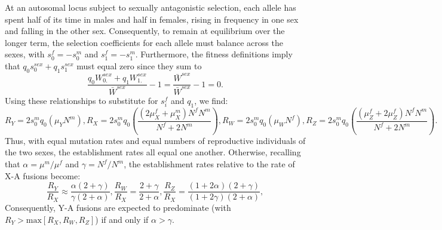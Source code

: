 At an autosomal locus subject to sexually antagonistic selection, each allele has spent half of its time in males and half in females, rising in frequency in one sex and falling in the other sex. Consequently, to remain at equilibrium over the longer term, the selection coefficients for each allele must balance across the sexes, with $s^f_0 = -s^m_0$ and $s^f_\text{1} = -s^m_\text{1}$. Furthermore, the fitness definitions imply that $q_0s^{sex}_0 + q_\text{1}s^{sex}_\text{1}$ must equal zero since they sum to
\[\frac{q_0W^{sex}_{0.} + q_\text{1}W^{sex}_{\text{1}.}}{\bar{W}^{sex}} - \text{1} = \frac{\bar{W}^{sex}}{\bar{W}^{sex}} - \text{1} = 0.\]
Using these relationships to substitute for $s^f_i$ and $q_\text{1}$, we find:
\begin{subequations}
\begin{equation}
R_Y = \text{2}s^m_0 q_0 (\mu_YN^m),
\end{equation}
\begin{equation}
R_X = \text{2}s^m_0 q_0 \left(\frac{(\text{2}\mu^f_X + \mu^m_X)N^fN^m}{N^f + \text{2}N^m} \right),
\end{equation}
\begin{equation}
R_W = \text{2}s^m_0 q_0 (\mu_WN^f),
\end{equation}
\begin{equation}
R_Z = \text{2}s^m_0 q_0 \left(\frac{(\mu^f_Z + \text{2}\mu^f_Z)N^fN^m}{N^f + \text{2}N^m} \right).
\end{equation}
\end{subequations}
Thus, with equal mutation rates and equal numbers of reproductive individuals of the two sexes, the establishment rates all equal one another. Otherwise, recalling that $\alpha = \mu^m/\mu^f$ and $\gamma = N^f / N^m$, the establishment rates relative to the rate of X-A fusions become:
\begin{subequations}
\begin{equation}
\frac{R_Y}{R_X} \approx \frac{\alpha(\text{2} + \gamma)}{\gamma(\text{2} + \alpha)},
\end{equation}
\begin{equation}
\frac{R_W}{R_X} = \frac{\text{2} + \gamma}{\text{2} + \alpha},
\end{equation}
\begin{equation}
\frac{R_Z}{R_X} = \frac{(\text{1} + \text{2}\alpha)(\text{2} + \gamma)}{(\text{1} + \text{2}\gamma)(\text{2} + \alpha)},
\end{equation}
\end{subequations}
Consequently, Y-A fusions are expected to predominate (with $R_Y>\text{max}[R_X,R_W,R_Z]$) if and only if $\alpha > \gamma$.
